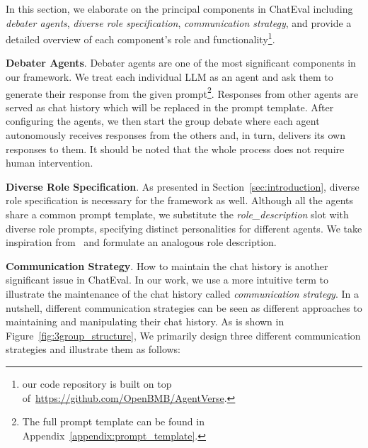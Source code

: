 In this section, we elaborate on the principal components in ChatEval including \textit{debater agents}, \textit{diverse role specification}, \textit{communication strategy}, and provide a detailed overview of each component's role and functionality\footnote{our code repository is built on top of~\url{https://github.com/OpenBMB/AgentVerse}.}.

\textbf{Debater Agents}. Debater agents are one of the most significant components in our framework. We treat each individual LLM as an agent and ask them to generate their response from the given prompt\footnote{The full prompt template can be found in Appendix~\ref{appendix:prompt_template}.}. Responses from other agents are served as chat history which will be replaced in the prompt template. After configuring the agents, we then start the group debate where each agent autonomously receives responses from the others and, in turn, delivers its own responses to them. It should be noted that the whole process does not require human intervention.

\textbf{Diverse Role Specification}. As presented in Section~\ref{sec:introduction}, diverse role specification is necessary for the framework as well. Although all the agents share a common prompt template, we substitute the \textit{role\_description} slot with diverse role prompts, specifying distinct personalities for different agents. We take inspiration from~\cite{wu2023large} and formulate an analogous role description. 


\textbf{Communication Strategy}.  How to maintain the chat history is another significant issue in ChatEval. In our work, we use a more intuitive term to illustrate the maintenance of the chat history called \textit{communication strategy}. In a nutshell, different communication strategies can be seen as different approaches to maintaining and manipulating their chat history. As is shown in Figure~\ref{fig:3group_structure}, We primarily design three different communication strategies and illustrate them as follows:

